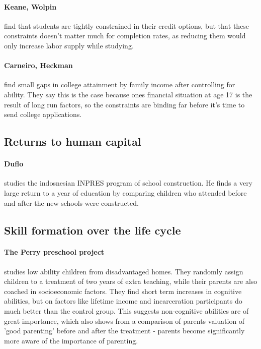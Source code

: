 \documentclass[12pt, a4paper]{article}
\begin{document}
\begin{multicols}{2}
\paragraph{Keane, Wolpin} find that students are tightly constrained in their credit options, but that these constraints doesn't matter much for completion rates, as reducing them would only increase labor supply while studying.

\paragraph{Carneiro, Heckman} find small gaps in college attainment by family income after controlling for ability. They say this is the case because ones financial situation at age 17 is the result of long run factors, so the constraints are binding far before it's time to send college applications.

\subsection{Returns to human capital}
\paragraph{Duflo } studies the indosnesian INPRES program of school construction. He finds a very large return to a year of education by comparing children who attended before and after the new schools were constructed.



\subsection{Skill formation over the life cycle}
\paragraph{The Perry preschool project} studies low ability children from disadvantaged homes. They randomly assign children to a treatment of two years of extra teaching, while their parents are also coached in socioeconomic factors. They find short term increases in cognitive abilities, but on factors like lifetime income and incarceration participants do much better than the control group. This suggests non-cognitive abilities are of great importance, which also shows from a comparison of parents valuation of 'good parenting' before and after the treatment - parents become significantly more aware of the importance of parenting.


\end{multicols}
\end{document}
